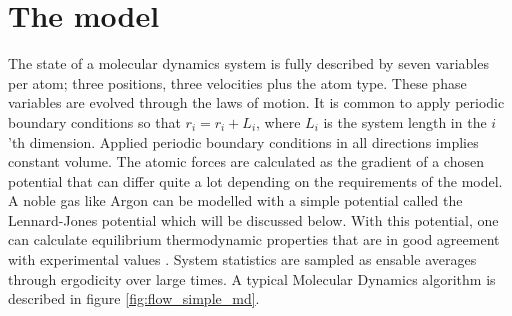 \section{The model}
\label{sec:md_model}
The state of a molecular dynamics system is fully described by seven variables per atom; three positions, three velocities plus the atom type. These phase variables are evolved through the laws of motion. It is common to apply periodic boundary conditions so that $r_i = r_i + L_i$, where $L_i$ is the system length in the $i$'th dimension. Applied periodic boundary conditions in all directions implies constant volume. The atomic forces are calculated as the gradient of a chosen potential that can differ quite a lot depending on the requirements of the model. A noble gas like Argon can be modelled with a simple potential called the Lennard-Jones potential which will be discussed below. With this potential, one can calculate equilibrium thermodynamic properties that are in good agreement with experimental values \cite{verlet1967computer}. System statistics are sampled as ensable averages through ergodicity over large times. A typical Molecular Dynamics algorithm is described in figure \ref{fig:flow_simple_md}.
